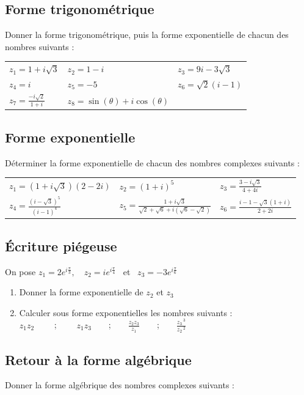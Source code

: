 \documentclass[oneside,12pt]{book}          %
\begin{document}
\subsection{Forme trigonométrique}
Donner la forme trigonométrique, puis la forme exponentielle de chacun des nombres suivants :\\
\begin{tabular}{p{} p{} p{}}
    $z_1=1+i\sqrt{3}$ & $z_2=1-i$ & $z_3= 9i-3\sqrt{3}$ \\
    $z_4=i$ & $z_5=-5$ & $z_6=\sqrt{2}(i-1)$ \\
    $z_7=\frac{-i\sqrt{2}}{1+i}$ & $z_8=\sin(\theta)+i\cos(\theta)$ 
\end{tabular}



\subsection{Forme exponentielle}
Déterminer la forme exponentielle de chacun des nombres complexes suivants : \\
\renewcommand{\arraystretch}{1.7}
\begin{tabular}{p{} p{} p{}}
    $z_1=(1+i\sqrt{3})(2-2i)$ & $z_2=(1+i)^5$ & $z_3=\frac{3-i\sqrt{3}}{4+4i}$ \\
    $z_4=\frac{(i-\sqrt{3})^5}{(i-1)^4}$ & $z_5=\frac{1+i\sqrt{3}}{\sqrt{2}+\sqrt{6}+i(\sqrt{6}-\sqrt{2})}$ & $z_6=\frac{i-1-\sqrt{3}(1+i)}{2+2i}$
\end{tabular}




\subsection{Écriture piégeuse}
On pose $z_1=2e^{i\frac{\pi}{3}}, \quad z_2=ie^{i\frac{\pi}{4}}$ \, et \, $z_3=-3e^{i\frac{\pi}{6}}$
\begin{enumerate}
	\item Donner la forme exponentielle de $z_2$ et $z_3$
	\item Calculer sous forme exponentielles les nombres suivants : \\
        $z_1z_2$ ~~~~;~~~~ $z_1z_3$~~~~;~~~~$\frac{z_2z_3}{z_1}$~~~~;~~~~$\frac{z_3\,^3}{z_2\,^2}$
\end{enumerate}



\subsection{Retour à la forme algébrique}
Donner la forme algébrique des nombres complexes suivants :
\end{document}
